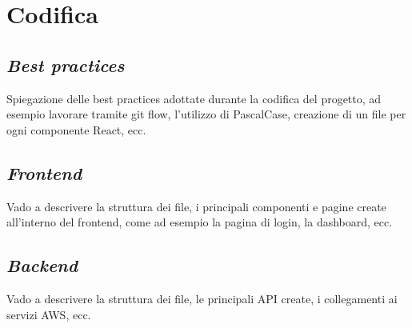 \section{Codifica}
\label{sez:codifica}

\subsection{\textit{Best practices}}
\label{sez:best-practices}

Spiegazione delle best practices adottate durante la codifica del progetto, ad esempio lavorare tramite git flow, l'utilizzo di PascalCase, creazione di un file per ogni componente React, ecc.

\subsection{\textit{Frontend}}
\label{sez:frontend}
Vado a descrivere la struttura dei file, i principali componenti e pagine create all'interno del frontend, come ad esempio la pagina di login, la dashboard, ecc.\\

\subsection{\textit{Backend}}
\label{sez:backend}

Vado a descrivere la struttura dei file, le principali API create, i collegamenti ai servizi AWS, ecc.\\
